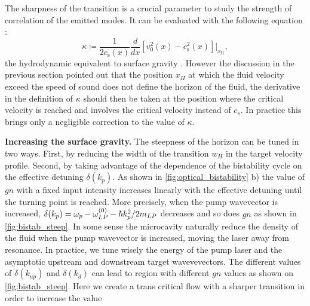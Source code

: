 The sharpness of the transition is a crucial parameter to study the strength of correlation of the emitted modes. It can be evaluated with the following equation :
\begin{equation}
    \kappa \coloneqq \frac{1}{2c_\mathrm{s}(x)}\frac{d}{dx}[v^2_0(x)-c^2_\mathrm{s}(x)]|_{x_\mathrm{H}},
    \label{eq:steepness}
\end{equation}
the hydrodynamic equivalent to surface gravity \cite{barcelo_hawking-like_2006}. However the discussion in the previous section 
pointed out that the position $x_H$ at which the fluid velocity exceed the speed of sound does not define the horizon of the fluid, the derivative
in the definition of $\kappa$ should then be taken at the position where the critical velocity is reached and involves the critical velocity instead of $c_s$.
In practice this brings only a negligible correction to the value of $\kappa$. 

\bigskip

\textbf{Increasing the surface gravity.}
The steepness of the horizon can be tuned in two ways. First, by reducing the width of the transition $w_H$ in the target velocity profile.
Second, by taking advantage of the dependence of the bistability cycle on the effective detuning $\delta(k_p)$.
As shown in \autoref{fig:optical_bistability} b) the value of $gn$ with a fixed input intensity increases linearly with the effective detuning until the turning point is reached. More precisely,
when the pump wavevector is increased,  $\delta(k_p) = \omega_p-\omega_{LP}^{(0)}- \hbar k_p^2/2m_{LP}$ decreases and so does $gn$ as shown in \autoref{fig:bistab_steep}. In some
sense the microcavity naturally reduce the density of the fluid when the pump wavevector is increased, moving the laser away from resonance.
In practice, we tune wisely the energy of the pump laser and the asymptotic upstream and downstream target wavevevectors. The different values of $\delta(k_{up})$ and $\delta(k_{d})$ can
lead to region with different $gn$ values as shown on \autoref{fig:bistab_steep}.
Here we create a trans critical flow with a sharper transition in order to increase the value 

